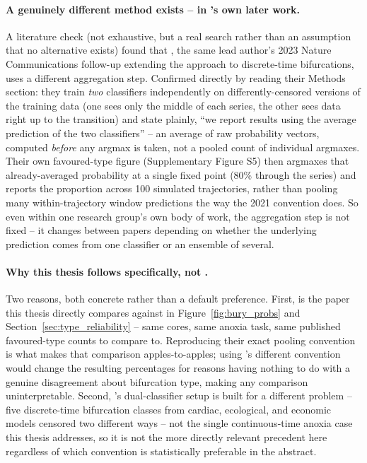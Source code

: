 \paragraph{A genuinely different method exists -- in \citet{bury2021}'s own later work.} A literature check (not exhaustive, but a real search rather than an assumption that no alternative exists) found that \citet{bury2023discretetime}, the same lead author's 2023 Nature Communications follow-up extending the approach to discrete-time bifurcations, uses a different aggregation step. Confirmed directly by reading their Methods section: they train \emph{two} classifiers independently on differently-censored versions of the training data (one sees only the middle of each series, the other sees data right up to the transition) and state plainly, ``we report results using the average prediction of the two classifiers'' -- an average of raw probability vectors, computed \emph{before} any argmax is taken, not a pooled count of individual argmaxes. Their own favoured-type figure (Supplementary Figure S5) then argmaxes that already-averaged probability at a single fixed point (80\% through the series) and reports the proportion across 100 simulated trajectories, rather than pooling many within-trajectory window predictions the way the 2021 convention does. So even within one research group's own body of work, the aggregation step is not fixed -- it changes between papers depending on whether the underlying prediction comes from one classifier or an ensemble of several.

\paragraph{Why this thesis follows \citet{bury2021} specifically, not \citet{bury2023discretetime}.} Two reasons, both concrete rather than a default preference. First, \citet{bury2021} is the paper this thesis directly compares against in Figure~\ref{fig:bury_probs} and Section~\ref{sec:type_reliability} -- same cores, same anoxia task, same published favoured-type counts to compare to. Reproducing their exact pooling convention is what makes that comparison apples-to-apples; using \citet{bury2023discretetime}'s different convention would change the resulting percentages for reasons having nothing to do with a genuine disagreement about bifurcation type, making any comparison uninterpretable. Second, \citet{bury2023discretetime}'s dual-classifier setup is built for a different problem -- five discrete-time bifurcation classes from cardiac, ecological, and economic models censored two different ways -- not the single continuous-time anoxia case this thesis addresses, so it is not the more directly relevant precedent here regardless of which convention is statistically preferable in the abstract.

